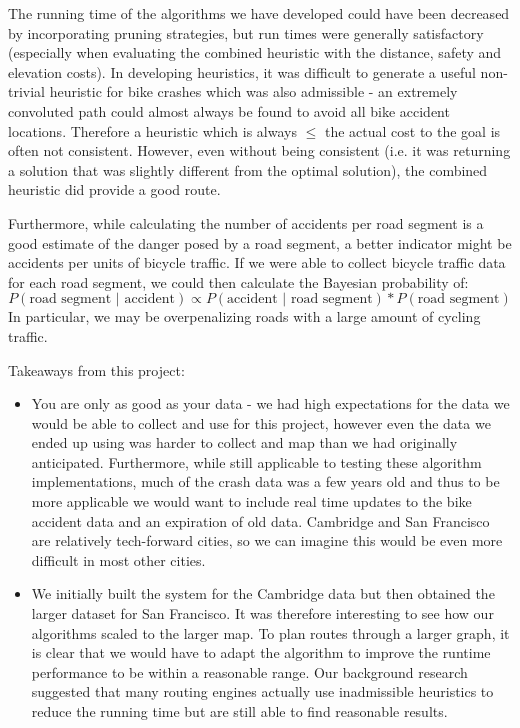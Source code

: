 \documentclass[11pt]{article}
\begin{document}
The running time of the algorithms we have developed could have been decreased by incorporating pruning strategies, but run times were generally satisfactory (especially when evaluating the combined heuristic with the distance, safety and elevation costs). In developing heuristics, it was difficult to generate a useful non-trivial heuristic for bike crashes which was also admissible - an extremely convoluted path could almost always be found to avoid all bike accident locations. Therefore a heuristic which is always $\le$ the actual cost to the goal is often not consistent. However, even without being consistent (i.e. it was returning a solution that was slightly different from the optimal solution), the combined heuristic did provide a good route.

\par
Furthermore, while calculating the number of accidents per road segment is a good estimate of the danger posed by a road segment, a better indicator might be accidents per units of bicycle traffic. If we were able to collect bicycle traffic data for each road segment, we could then calculate the Bayesian probability of:
\begin{equation}
P(\text{road segment $\vert$ accident}) \propto P(\text{accident $\vert$ road segment}) * P(\text{road segment})
\end{equation}In particular, we may be overpenalizing roads with a large amount of cycling traffic.
\par

\par
\noindent Takeaways from this project:
\begin{itemize}
\item You are only as good as your data - we had high expectations for the data we would be able to collect and use for this project, however even the data we ended up using was harder to collect and map than we had originally anticipated. Furthermore, while still applicable to testing these algorithm implementations, much of the crash data was a few years old and thus to be more applicable we would want to include real time updates to the bike accident data and an expiration of old data. Cambridge and San Francisco are relatively tech-forward cities, so we can imagine this would be even more difficult in most other cities.
\item We initially built the system for the Cambridge data but then obtained the larger dataset for San Francisco. It was therefore interesting to see how our algorithms scaled to the larger map. To plan routes through a larger graph, it is clear that we would have to adapt the algorithm to improve the runtime performance to be within a reasonable range. Our background research suggested that many routing engines actually use inadmissible heuristics to reduce the running time but are still able to find reasonable results. 
\end{itemize}
\end{document}
